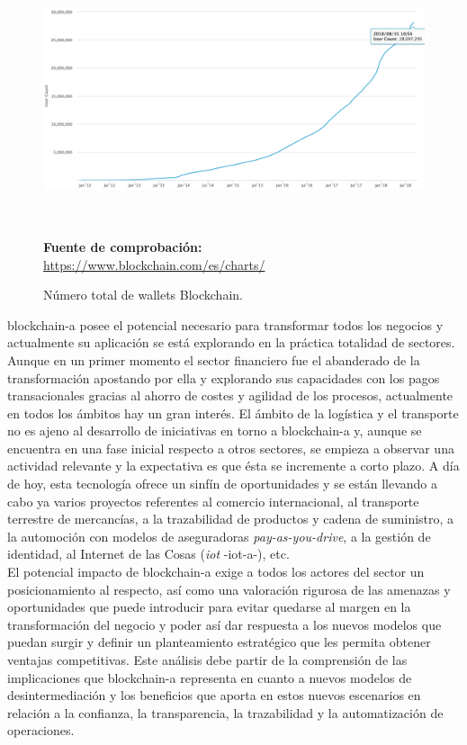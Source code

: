 \documentclass[12pt,a4paper, twoside]{report}
\begin{document}
		\begin{figure}[!ht]   
			\caption{Número total de wallets Blockchain.} 
			\begin{center} 
				\includegraphics[width=16cm,height=8cm]{Images/stateArt/wallets} \\
				\label{fig:stateArt_wallet}
				 \textbf{Fuente de comprobación:} \url{https://www.blockchain.com/es/charts/}
			\end{center}  
		\end{figure}
			
	\gls{blockchain-a} posee el potencial necesario para transformar todos los negocios y actualmente su aplicación se está explorando en la práctica totalidad de sectores. Aunque en un primer momento el sector financiero fue el abanderado de la transformación apostando por ella y explorando sus capacidades con los pagos transacionales gracias al ahorro de costes y agilidad de los procesos, actualmente en todos los ámbitos hay un gran interés. El ámbito de la logística y el transporte no es ajeno al desarrollo de iniciativas en torno a \gls{blockchain-a} y, aunque se encuentra en una fase inicial respecto a otros sectores, se empieza a observar una actividad relevante y la expectativa es que ésta se incremente a corto plazo. A día de hoy, esta tecnología ofrece un sinfín de oportunidades y se están llevando a cabo ya varios proyectos referentes al comercio internacional, al transporte terrestre de mercancías, a la trazabilidad de productos y cadena de suministro, a la automoción con modelos de aseguradoras
		\textit{pay-as-you-drive}, a la gestión de identidad, al Internet de las Cosas (\textit{\gls{iot}} -\gls{iot-a}-), etc. \\

	El potencial impacto de \gls{blockchain-a} exige a todos los actores del sector un posicionamiento al respecto, así como una valoración rigurosa de las amenazas y oportunidades que puede introducir para evitar quedarse al margen en la transformación del negocio y poder así dar respuesta a los nuevos modelos que puedan surgir y definir un planteamiento estratégico que les permita obtener ventajas competitivas. Este análisis debe partir de la comprensión de las implicaciones que \gls{blockchain-a} representa en cuanto a nuevos modelos de desintermediación y los beneficios que aporta en estos nuevos escenarios en relación a la confianza, la transparencia, la trazabilidad y la automatización de operaciones.
	
\end{document}
